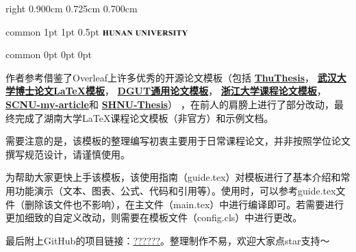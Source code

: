 \documentclass[
    report,     %
    oneside,    %
    UTF8,       %
    zihao=-4    %
]{config} %
\begin{document}
\CoverPage
    {right} %
    {0.900cm} %
    {0.725cm} %
    {0.700cm} %


\Header
    {common} %
    {1pt} %
    {1pt} %
    {0.5pt} %
    {} %
    {\includegraphics[width=0.25\textwidth]{figures/logos/HNU-title-EN.png}} %
    {} %


\Footer
    {common} %
    {0pt} %
    {0pt} %
    {0pt} %
    {} %
    {\thepage} %
    {} %


\SetRomanPageNumber{} %


\begin{abstractCN}[0.6cm] %

作者参考借鉴了Overleaf上许多优秀的开源论文模板（包括
\href{https://github.com/tuna/thuthesis}{\textbf{ThuThesis}}，
\href{http://aff.whu.edu.cn/huangzh/}{\textbf{武汉大学博士论文\LaTeX{}模板}}，
\href{https://www.overleaf.com/latex/templates/dguttong-yong-lun-wen-slash-bao-gao-slash-zuo-ye-mo-ban-fei-guan-fang/gkymcyhwhjhj}{\textbf{DGUT通用论文模板}}，
\href{https://www.overleaf.com/latex/templates/zhe-jiang-da-xue-ke-cheng-lun-wen-mo-ban/mjpzqvgsmdzn}{\textbf{浙江大学课程论文模板}}，
\href{https://www.overleaf.com/latex/templates/scnu-my-article/jkbbvhnddtsw}{\textbf{SCNU-my-article}}和
\href{https://www.overleaf.com/latex/templates/shnu-thesis/wsykzrksspgn}{\textbf{SHNU-Thesis}}）
，在前人的肩膀上进行了部分改动，最终完成了湖南大学\LaTeX{}课程论文模板（非官方）和示例文档。

需要注意的是，该模板的整理编写初衷主要用于日常课程论文，并非按照学位论文撰写规范设计，请谨慎使用。

为帮助大家更快上手该模板，该使用指南（guide.tex）对模板进行了基本介绍和常用功能演示（文本、图表、公式、代码和引用等）。使用时，可以参考guide.tex文件（删除该文件也不影响），在主文件（main.tex）中进行编译即可。若需要进行更加细致的自定义改动，则需要在模板文件（config.cls）中进行更改。


最后附上GitHub的项目链接：\url{??????}。整理制作不易，欢迎大家点star支持～


\def\keywordsCN{关键词1；关键词2；关键词3；关键词4；关键词5}

\end{abstractCN}
\end{document}
